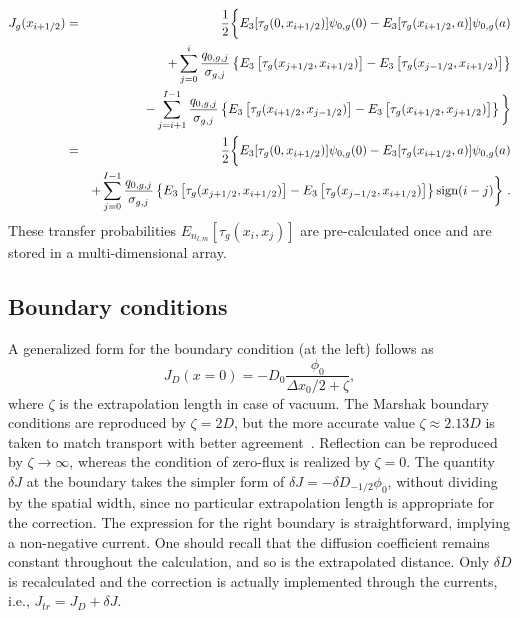 \begin{eqnarray}\label{eq:tot-J-disc2-l=0}
J_g(x_{i+1/2}) &=& \frac{1}{2}
\bigg\{
E_3[\tau_g(0,x_{i+1/2})] \psi_{0,g}(0) 
- E_3[\tau_g(x_{i+1/2},a)]\psi_{0,g}(a)  \nonumber \\
&&+
\sum\limits_{j=0}^i \frac{q_{0,g,j}}{\sigma_{g,j}} 
\left\{
E_3\left[
\tau_g(x_{j+1/2},x_{i+1/2}) \right] 
- E_3\left[
\tau_g(x_{j-1/2},x_{i+1/2})
\right] 
\right\}
\nonumber \\
&&-
\sum\limits_{j=i+1}^{I-1} \frac{q_{0,g,j}}{\sigma_{g,j}} 
\left\{
E_3\left[
\tau_g(x_{i+1/2},x_{j-1/2}) \right] 
- E_3\left[
\tau_g(x_{i+1/2},x_{j+1/2})
\right]
\right\}
\bigg\}	\nonumber \\
&=&\frac{1}{2}
\bigg\{
E_3[\tau_g(0,x_{i+1/2})] \psi_{0,g}(0) 
- E_3[\tau_g(x_{i+1/2},a)]\psi_{0,g}(a)  \nonumber \\
&&+
\sum\limits_{j=0}^{I-1} \frac{q_{0,g,j}}{\sigma_{g,j}} 
\left\{
E_3\left[
\tau_g(x_{j+1/2},x_{i+1/2}) \right] 
- E_3\left[
\tau_g(x_{j-1/2},x_{i+1/2})
\right] 
\right\}\text{sign}(i-j)
\bigg\}
\,\, . 
\end{eqnarray}
These transfer probabilities $E_{n_{l,m}}[\tau_g(x_i,x_j)]$ are pre-calculated once and are stored in a multi-dimensional array.

%
\subsection{Boundary conditions}
\label{sec:BC}
A generalized form for the boundary condition (at the left) follows as
\begin{equation}\label{eq:BC}
J_D(x=0) = -D_0\frac{\phi_0}{\Delta x_0/2 + \zeta} ,
\end{equation} 
where $\zeta$ is the extrapolation length in case of vacuum. The Marshak boundary conditions are reproduced by $\zeta=2D$, but the more accurate value $\zeta\approx 2.13D$ is taken to match transport with better agreement~\cite{Lamarsh-1966}. Reflection can be reproduced by $\zeta\rightarrow\infty$, whereas the condition of zero-flux is realized by $\zeta=0$. 
%
The quantity $\delta J$ at the boundary takes the simpler form of $\delta J = -\delta D_{-1/2}\phi_0$, without dividing by the spatial width, since no particular extrapolation length is appropriate for the correction. The expression for the right boundary is straightforward, implying a non-negative current. One should recall that the diffusion coefficient remains constant throughout the calculation, and so is the extrapolated distance. Only $\delta D$ is recalculated and the correction is actually implemented through the currents, i.e., $J_{tr} = J_D + \delta J$.

